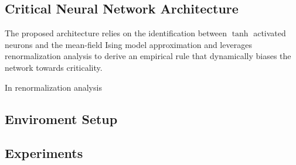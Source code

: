 \subsection{Critical Neural Network Architecture}

The proposed architecture relies on the identification between $\tanh$ activated neurons and the mean-field Ising model approximation and leverages renormalization analysis to derive an empirical rule that dynamically biases the network towards criticality.

In renormalization analysis

\subsection{Enviroment Setup}


\subsection{Experiments}